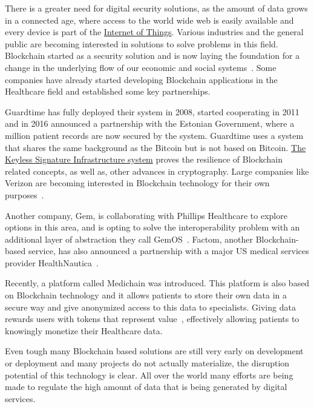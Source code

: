 There is a greater need for digital security solutions, as the amount of data
grows in a connected age, where access to the world wide web is easily
available and every device is part of the
\href{https://en.wikipedia.org/wiki/Internet_of_things}{Internet of Things}.
Various industries and the general public are becoming interested in solutions
to solve problems in this field. Blockchain started as a security solution and
is now laying the foundation for a change in the underlying flow of our
economic and social systems~\cite{Zago2018,Marr2018,Long2018}. Some companies
have already started developing Blockchain applications in the Healthcare field
and established some key partnerships.

Guardtime has fully deployed their system in 2008, started cooperating in 2011
and in 2016 announced a partnership with the Estonian Government, where a
million patient records are now secured by the system. Guardtime uses a system
that shares the same background as the Bitcoin but is not based on Bitcoin.
\href{https://guardtime.com/technology}{The Keyless Signature Infrastructure
system} proves the resilience of Blockchain related concepts, as well as, other
advances in cryptography. Large companies like Verizon are becoming interested
in Blockchain technology for their own
purposes~\cite{GuardTime2018,EstonianGovernmentGuardTime2016}.

Another company, Gem, is collaborating with Phillips Healthcare to explore
options in this area\cite{philips2016}, and is opting to solve the
interoperability problem with an additional layer of abstraction they call
GemOS~\cite{gemOS2018}. Factom, another Blockchain-based service, has also
announced a partnership with a major US medical services provider
HealthNautica~\cite{BlockchainCompHealth2017,FactomPartnership2017}.

Recently, a platform called Medichain was introduced. This platform is also
based on Blockchain technology and it allows patients to store their own data
in a secure way and give anonymized access to this data to specialists. Giving
data rewards users with tokens that represent value~\cite{MediChain2018},
effectively allowing patients to knowingly monetize their Healthcare data.

Even tough many Blockchain based solutions are still very early on development
or deployment and many projects do not actually materialize, the disruption
potential of this technology is clear. All over the world many efforts are
being made to regulate the high amount of data that is being generated by
digital services.

